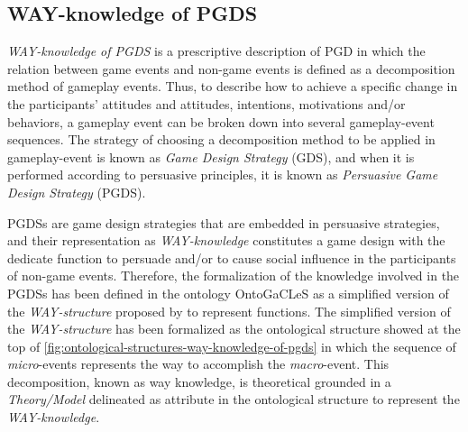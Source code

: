\subsection{WAY-knowledge of PGDS}
\label{subsec:way-knowledge-of-persuasive-game-design}

\emph{WAY-knowledge of PGDS} is a prescriptive description of PGD in which the relation between game events and non-game events is defined as a decomposition method of gameplay events.
Thus, to describe how to achieve a specific change in the participants' attitudes and attitudes, intentions, motivations and/or behaviors, a gameplay event can be broken down into several gameplay-event sequences.
The strategy of choosing a decomposition method to be applied in gameplay-event is known as \emph{Game Design Strategy} (GDS), and when it is performed according to persuasive principles, it is known as \emph{Persuasive Game Design Strategy} (PGDS).

PGDSs are game design strategies that are embedded in persuasive strategies, and their representation as \emph{WAY-knowledge} constitutes a game design with the dedicate function to persuade and/or to cause social influence in the participants of non-game events.
Therefore, the formalization of the knowledge involved in the PGDSs has been defined in the ontology OntoGaCLeS as a simplified version of the \emph{WAY-structure} proposed by  to represent functions.
The simplified version of the \emph{WAY-structure} has been formalized  as the ontological structure showed at the top of \autoref{fig:ontological-structures-way-knowledge-of-pgds} in which the sequence of \emph{micro}-events represents the way to accomplish the \emph{macro}-event.
This decomposition, known as way knowledge, is theoretical grounded in a \emph{Theory/Model} delineated as attribute  in the ontological structure to represent the \emph{WAY-knowledge}.

